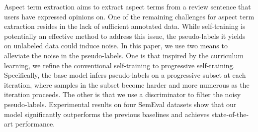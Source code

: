 Aspect term extraction aims to extract aspect terms from a review sentence that users have expressed opinions on. One of the remaining challenges for aspect term extraction resides in the lack of sufficient annotated data. While self-training is potentially an effective method to address this issue, the pseudo-labels it yields on unlabeled data could induce noise. In this paper, we use two means to alleviate the noise in the pseudo-labels. One is that inspired by the curriculum learning, we refine the conventional self-training to progressive self-training. Specifically, the base model infers pseudo-labels on a progressive subset at each iteration, where samples in the subset become harder and more numerous as the iteration proceeds. The other is that we use a discriminator to filter the noisy pseudo-labels. Experimental results on four SemEval datasets show that our model significantly outperforms the previous baselines and achieves state-of-the-art performance.
